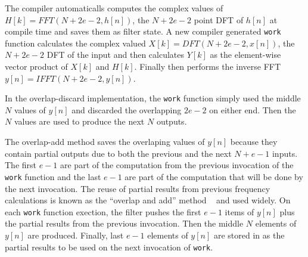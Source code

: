 The compiler automaticalls computes the complex values of $H[k]=FFT(N+2e-2,h[n])$,
the $N+2e-2$ point DFT of $h[n]$ at compile time and saves them as filter state. 
A new compiler generated {\tt work} function calculates the complex valued $X[k]=DFT(N+2e-2,x[n])$, 
the $N+2e-2$ DFT of the input and then calculates $Y[k]$ as the element-wise vector 
product of $X[k]$ and $H[k]$. Finally then performs the inverse FFT $y[n]=IFFT(N+2e-2,y[n])$.

In the overlap-discard implementation, the {\tt work} function simply used the middle $N$ 
values of $y[n]$ and discarded the overlapping $2e-2$ on either end. Then the $N$ values 
are used to produce the next $N$ outputs.

The overlap-add method saves the overlaping values of $y[n]$ because they contain partial
outputs due to both the previous and the next $N+e-1$ inputs.
The first $e-1$ are part of the computation from the previous invocation of the 
{\tt work} function and the last $e-1$ are part of the computation that will be done
by the next invocation. 
The reuse of partial results from previous frequency calculations is known 
as the ``overlap and add'' method ~\cite{oppenheim-discrete} and used widely.
On each {\tt work} function exection, the filter pushes the first $e-1$ items 
of $y[n]$ plus the partial results from the previous invocation. Then the middle 
$N$ elements of $y[n]$ are produced. Finally, last $e-1$ elements 
of $y[n]$ are stored in as the partial results to be used on the next 
invocation of {\tt work}.

